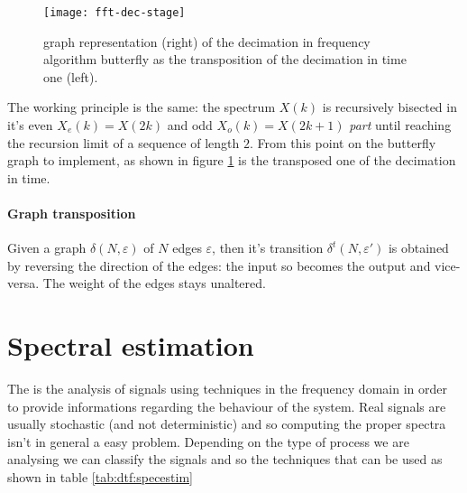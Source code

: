 		\begin{figure}[b!]
			\centering \texttt{[image: fft-dec-stage]}
			\caption{graph representation (right) of the decimation in frequency algorithm butterfly as the transposition of the decimation in time one (left).} \label{fig:dft:decfreq}
		\end{figure}
	
		The working principle is the same: the spectrum $X(k)$ is recursively bisected in it's even $X_e(k) = X(2k)$ and odd $X_o(k) = X(2k+1)$ \textit{part} until reaching the recursion limit of a sequence of length $2$. From this point on the butterfly graph to implement, as shown in figure \ref{fig:dft:decfreq} is the transposed one of the decimation in time.
		
		\paragraph{Graph transposition} Given a graph $\delta(N,\varepsilon)$ of $N$ edges $\varepsilon$, then it's transition $\delta^t(N,\varepsilon')$ is obtained by reversing the direction of the edges: the input so becomes the output and vice-versa. The weight of the edges stays unaltered.		
			
\section{Spectral estimation}
	
	The  is the analysis of signals using techniques in the frequency domain in order to provide informations regarding the behaviour of the system. Real signals are usually stochastic (and not deterministic) and so computing the proper spectra isn't in general a easy problem. Depending on the type of process we are analysing we can classify the signals and so the techniques that can be used as shown in table \ref{tab:dtf:specestim}
	
